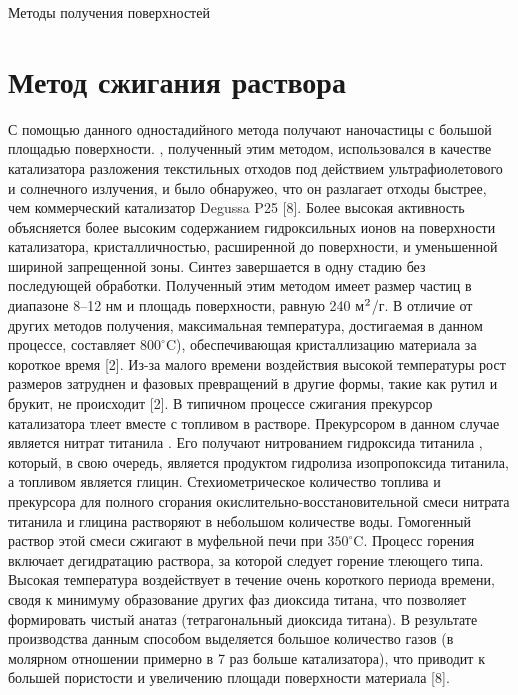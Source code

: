 \documentclass[oneside,final,12pt]{extreport}
\begin{document}
\begin{chapter} {Методы получения поверхностей }
\section{Метод сжигания раствора}

С помощью данного одностадийного метода получают наночастицы  с большой площадью поверхности. , полученный этим методом, использовался в качестве катализатора разложения текстильных отходов под действием ультрафиолетового и солнечного излучения, и было обнаружео, что он разлагает отходы быстрее, чем коммерческий катализатор Degussa P25 [8]. Более высокая активность объясняется более высоким содержанием гидроксильных ионов на поверхности катализатора, кристалличностью, расширенной до поверхности, и уменьшенной шириной запрещенной зоны. Синтез  завершается в одну стадию без последующей обработки. Полученный этим методом  имеет размер частиц в диапазоне 8–12 нм и площадь поверхности, равную 240 м$\textsuperscript{2}$/г. В отличие от других методов получения, максимальная температура, достигаемая в данном процессе, составляет $800^{\circ}$C), обеспечивающая кристаллизацию материала за короткое время [2]. Из-за малого времени воздействия высокой температуры рост размеров  затруднен и фазовых превращений в другие формы, такие как рутил и брукит, не происходит [2]. В типичном процессе сжигания прекурсор катализатора тлеет вместе с топливом в растворе. Прекурсором в данном случае является нитрат титанила . Его получают нитрованием гидроксида титанила , который, в свою очередь, является продуктом гидролиза изопропоксида титанила, а топливом является глицин. Стехиометрическое количество топлива и прекурсора для полного сгорания окислительно-восстановительной смеси нитрата титанила и глицина растворяют в небольшом количестве воды. Гомогенный раствор этой смеси сжигают в муфельной печи при $350^{\circ}$C. Процесс горения включает дегидратацию раствора, за которой следует горение тлеющего типа. Высокая температура воздействует в течение очень короткого периода времени, сводя к минимуму образование других фаз диоксида титана, что позволяет формировать чистый анатаз (тетрагональный диоксида титана). В результате производства  данным способом выделяется большое количество газов (в молярном отношении примерно в 7 раз больше катализатора), что приводит к большей пористости и увеличению площади поверхности материала [8].
\end{chapter}

\end{document}
